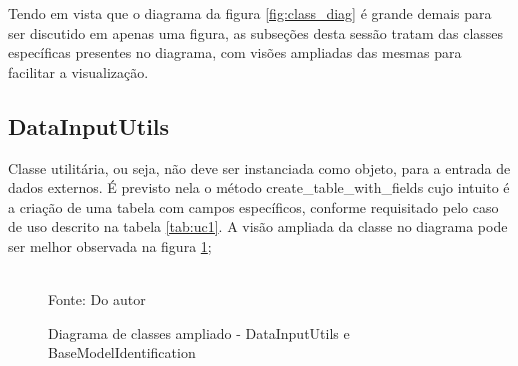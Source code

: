 Tendo em vista que o diagrama da figura \ref{fig:class_diag} é grande demais para ser discutido em apenas uma figura,
as subseções desta sessão tratam das classes específicas presentes no diagrama, com visões ampliadas das mesmas para
facilitar a visualização.

\subsection{DataInputUtils}

Classe utilitária, ou seja, não deve ser instanciada como objeto, para a entrada de dados externos.
É previsto nela o método create\_table\_with\_fields cujo intuito é a criação de uma tabela com campos específicos,
conforme requisitado pelo caso de uso descrito na tabela \ref{tab:uc1}.
A visão ampliada da classe no diagrama pode ser melhor observada na figura \ref{fig:class_diag_diubmi};

\begin{figure}[H]
    \centering
    \caption{Diagrama de classes ampliado - DataInputUtils e BaseModelIdentification}
    \label{fig:class_diag_diubmi}
    \\
    \vspace{0cm}\hspace{0cm}\small{Fonte: Do autor}
\end{figure}

